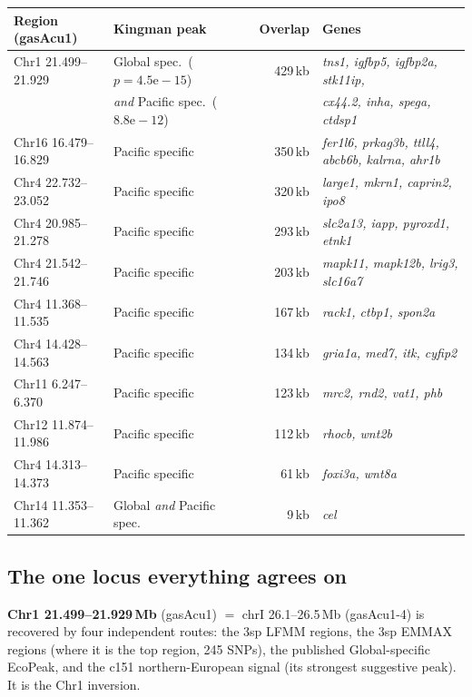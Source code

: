 \documentclass[11pt,a4paper]{article}
\newcommand{\gene}[1]{\textit{#1}}
\begin{document}
\begin{table}[h]\centering\small
\begin{tabular}{llrl}\toprule
Region (gasAcu1) & Kingman peak & Overlap & Genes \\ \midrule
Chr1 21.499--21.929 & Global spec.\ ($p{=}4.5\mathrm{e}{-}15$) & 429\,kb & \gene{tns1, igfbp5, igfbp2a, stk11ip,} \\
                    & \emph{and} Pacific spec.\ ($8.8\mathrm{e}{-}12$) & & \gene{cx44.2, inha, spega, ctdsp1} \\
Chr16 16.479--16.829 & Pacific specific & 350\,kb & \gene{fer1l6, prkag3b, ttll4, abcb6b, kalrna, ahr1b} \\
Chr4 22.732--23.052 & Pacific specific & 320\,kb & \gene{large1, mkrn1, caprin2, ipo8} \\
Chr4 20.985--21.278 & Pacific specific & 293\,kb & \gene{slc2a13, iapp, pyroxd1, etnk1} \\
Chr4 21.542--21.746 & Pacific specific & 203\,kb & \gene{mapk11, mapk12b, lrig3, slc16a7} \\
Chr4 11.368--11.535 & Pacific specific & 167\,kb & \gene{rack1, ctbp1, spon2a} \\
Chr4 14.428--14.563 & Pacific specific & 134\,kb & \gene{gria1a, med7, itk, cyfip2} \\
Chr11 6.247--6.370  & Pacific specific & 123\,kb & \gene{mrc2, rnd2, vat1, phb} \\
Chr12 11.874--11.986 & Pacific specific & 112\,kb & \gene{rhocb, wnt2b} \\
Chr4 14.313--14.373 & Pacific specific & 61\,kb & \gene{foxi3a, wnt8a} \\
Chr14 11.353--11.362 & Global \emph{and} Pacific spec. & 9\,kb & \gene{cel} \\ \bottomrule
\end{tabular}
\end{table}

\subsection{The one locus everything agrees on}

\textbf{Chr1 21.499--21.929\,Mb} (gasAcu1) $=$ chrI 26.1--26.5\,Mb (gasAcu1-4) is recovered
by four independent routes: the 3sp LFMM regions, the 3sp EMMAX regions (where it is the
top region, 245 SNPs), the published Global-specific EcoPeak, and the c151
northern-European signal (its strongest suggestive peak). It is the Chr1 inversion.
\end{document}

